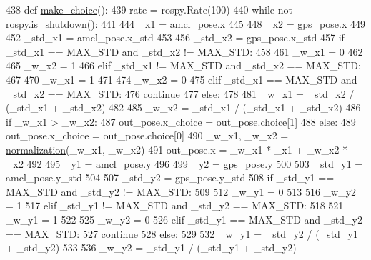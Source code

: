 \begin{DoxyCode}
438 \textcolor{keyword}{def }\hyperlink{namespacefuse___g___a__dox_ad6aad4771679d9483d428a51103c238b}{make\_choice}():
439     rate = rospy.Rate(100)
440     \textcolor{keywordflow}{while} \textcolor{keywordflow}{not} rospy.is\_shutdown():
441         
444         \_x1 = amcl\_pose.x
445         
448         \_x2 = gps\_pose.x
449         
452         \_std\_x1 = amcl\_pose.x\_std
453         
456         \_std\_x2 = gps\_pose.x\_std
457         \textcolor{keywordflow}{if} \_std\_x1 == MAX\_STD \textcolor{keywordflow}{and} \_std\_x2 != MAX\_STD:
458             
461             \_w\_x1 = 0
462             
465             \_w\_x2 = 1
466         \textcolor{keywordflow}{elif} \_std\_x1 != MAX\_STD \textcolor{keywordflow}{and} \_std\_x2 == MAX\_STD:
467             
470             \_w\_x1 = 1
471             
474             \_w\_x2 = 0
475         \textcolor{keywordflow}{elif} \_std\_x1 == MAX\_STD \textcolor{keywordflow}{and} \_std\_x2 == MAX\_STD:
476             \textcolor{keywordflow}{continue}
477         \textcolor{keywordflow}{else}:
478             
481             \_w\_x1 = \_std\_x2 / (\_std\_x1 + \_std\_x2)
482             
485             \_w\_x2 = \_std\_x1 / (\_std\_x1 + \_std\_x2)
486         \textcolor{keywordflow}{if} \_w\_x1 > \_w\_x2:
487             out\_pose.x\_choice = out\_pose.choice[1]
488         \textcolor{keywordflow}{else}:
489             out\_pose.x\_choice = out\_pose.choice[0]
490         \_w\_x1, \_w\_x2 = \hyperlink{namespacefuse___g___a__dox_ab338e80a4f259a8d14b03d63b4c19d3b}{normalization}(\_w\_x1, \_w\_x2)
491         out\_pose.x = \_w\_x1 * \_x1 + \_w\_x2 * \_x2
492         
495         \_y1 = amcl\_pose.y
496         
499         \_y2 = gps\_pose.y
500         
503         \_std\_y1 = amcl\_pose.y\_std
504         
507         \_std\_y2 = gps\_pose.y\_std
508         \textcolor{keywordflow}{if} \_std\_y1 == MAX\_STD \textcolor{keywordflow}{and} \_std\_y2 != MAX\_STD:
509             
512             \_w\_y1 = 0
513             
516             \_w\_y2 = 1
517         \textcolor{keywordflow}{elif} \_std\_y1 != MAX\_STD \textcolor{keywordflow}{and} \_std\_y2 == MAX\_STD:
518             
521             \_w\_y1 = 1
522             
525             \_w\_y2 = 0
526         \textcolor{keywordflow}{elif} \_std\_y1 == MAX\_STD \textcolor{keywordflow}{and} \_std\_y2 == MAX\_STD:
527             \textcolor{keywordflow}{continue}
528         \textcolor{keywordflow}{else}:
529             
532             \_w\_y1 = \_std\_y2 / (\_std\_y1 + \_std\_y2)
533             
536             \_w\_y2 = \_std\_y1 / (\_std\_y1 + \_std\_y2)

\end{DoxyCode}
